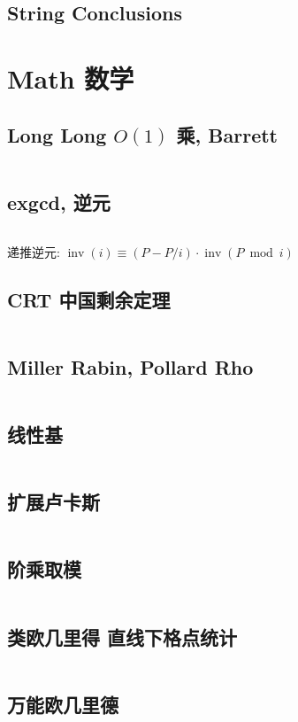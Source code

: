 \documentclass[titlepage, a4paper, 11pt]{article}
\begin{document}
\begin{spacing}{1.15}
				\subsection{String Conclusions}
					
			\newpage
			\section{Math 数学}
				\subsection{Long Long $O(1)$ 乘, Barrett}
					\inputminted{cpp}{src/Miscellany/LLFPM.cpp}
				\subsection{exgcd, 逆元}
					
					\inputminted{cpp}{src/Math/exgcd.cpp}
					递推逆元: $\operatorname{inv}(i) \equiv (P - P / i) \cdot \operatorname{inv}(P \bmod i)$
				\subsection{CRT 中国剩余定理}
					\inputminted{cpp}{src/Math/CRT_lbn.cpp}
				\subsection{Miller Rabin, Pollard Rho}
					\inputminted{cpp}{src/Math/Miller Rabin And Pollard Rho.cpp}
				\subsection{线性基}
					\inputminted{cpp}{src/Math/线性基.cpp}
				\subsection{扩展卢卡斯}
					\inputminted{cpp}{src/Math/扩展卢卡斯.cpp}
				\subsection{阶乘取模}
					\inputminted{cpp}{src/Math/Factorial Mod.cpp}
				\subsection{类欧几里得 直线下格点统计}
					\inputminted{cpp}{src/Math/直线下格点统计.cpp}
				\subsection{万能欧几里德}
					\inputminted{cpp}{src/zjj/euclid.cpp}

\end{spacing}
\end{document}

